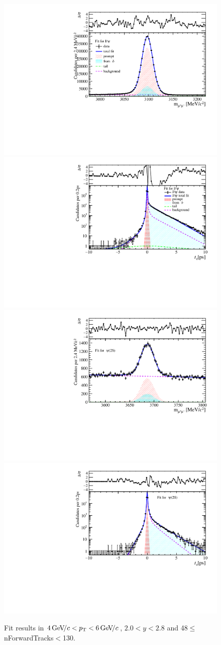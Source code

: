 \begin{figure}[H]
\begin{center}
\includegraphics[width=0.47\linewidth]{pdf/Jpsi/drawmassF/n5y1pt3.pdf}
\includegraphics[width=0.47\linewidth]{pdf/Jpsi/2DFitF/n5y1pt3.pdf}
\vspace*{-0.5cm}
\includegraphics[width=0.47\linewidth]{pdf/Psi2S/drawmassF/n5y1pt3.pdf}
\includegraphics[width=0.47\linewidth]{pdf/Psi2S/2DFitF/n5y1pt3.pdf}
\vspace*{-0.5cm}
\end{center}
\caption{Fit results in $4\text{\,Ge\kern -0.1em V\!/}c<p_{\mathrm{T}}<6\text{\,Ge\kern -0.1em V\!/}c$, $2.0<y<2.8$ and 48$\leq$nForwardTracks$<$130.}
\label{Fitn5y1pt3}
\end{figure}
